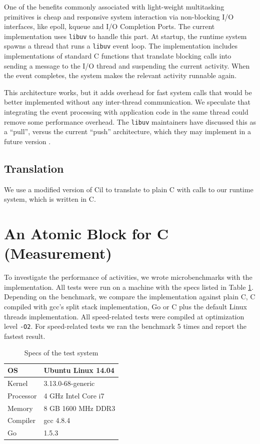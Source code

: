 \documentclass[acmsmall,anonymous,review]{acmart}\settopmatter{printfolios=true,printccs=false,printacmref=false}
\begin{document}
One of the benefits commonly associated with light-weight multitasking primitives is cheap and responsive system interaction via non-blocking I/O interfaces, like epoll, kqueue and I/O Completion Ports.
The current \charcoal{} implementation uses \texttt{libuv} to handle this part.
At startup, the runtime system spawns a thread that runs a \texttt{libuv} event loop.
The \charcoal{} implementation includes implementations of standard C functions that translate blocking calls into sending a message to the I/O thread and suspending the current activity.
When the event completes, the system makes the relevant activity runnable again.

This architecture works, but it adds overhead for fast system calls that would be better implemented without any inter-thread communication.
We speculate that integrating the event processing with application code in the same thread could remove some performance overhead.
The \texttt{libuv} maintainers have discussed this as a ``pull'', versus the current ``push'' architecture, which they may implement in a future version \cite{libuv2014}.

\subsection{Translation}

We use a modified version of Cil \cite{Necula2002} to translate \charcoal{} to plain C with calls to our runtime system, which is written in C.

\section{An Atomic Block for C (Measurement)}

To investigate the performance of activities, we wrote microbenchmarks with the \charcoal{} implementation.
All tests were run on a machine with the specs listed in Table \ref{table:specs}.
Depending on the benchmark, we compare the \charcoal{} implementation against plain C, C compiled with gcc's split stack implementation, Go or C plus the default Linux threads implementation.
All speed-related tests were compiled at optimization level \texttt{-O2}.
For speed-related tests we ran the benchmark 5 times and report the fastest result.

\begin{table}
  \centering
  \begin{tabular}{|l|l|}
    \hline
    OS & Ubuntu Linux 14.04 \\
    \hline
    Kernel & 3.13.0-68-generic \\
    \hline
    Processor & 4 GHz Intel Core i7 \\
    \hline
    Memory & 8 GB 1600 MHz DDR3 \\
    \hline
    Compiler & gcc 4.8.4 \\
    \hline
    Go & 1.5.3 \\
    \hline
  \end{tabular}
  \caption{Specs of the test system}
  \label{table:specs}
\end{table}
\end{document}
